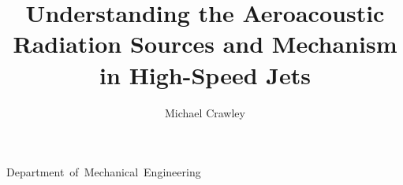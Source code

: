 \documentclass{osudissert96}
\begin{document}
%
%

\author{Michael Crawley}
\title{Understanding the Aeroacoustic Radiation Sources and Mechanism in High-Speed Jets}
\unit{Department of Mechanical Engineering}



%
%

\maketitle
\disscopyright


%
%

\begin{abstract}
  
\end{abstract}

\dedication{This work is dedicated to Science \ldots}


%
%





%
%

\tableofcontents
\listoftables
\listoffigures


%
%

       

  





%
%



\end{document}

